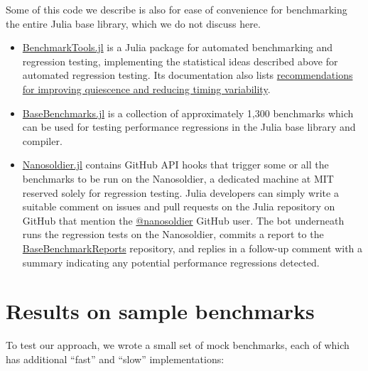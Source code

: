\documentclass[conference]{IEEEtran}
\begin{document}
Some of this code we describe is also for ease of convenience for benchmarking
the entire Julia base library, which we do not discuss here.

\begin{itemize}

\item
\href{https://github.com/JuliaCI/BenchmarkTools.jl}{BenchmarkTools.jl}
is a Julia package for automated benchmarking and regression testing, implementing the statistical ideas described above for automated regression testing. Its documentation also lists \href{https://github.com/JuliaCI/BenchmarkTools.jl/blob/60dfe83e5434c87b7311ca5d9f185f45752ed510/doc/linuxtips.md}{recommendations for improving quiescence and reducing timing variability}.

\item
\href{https://github.com/JuliaCI/BaseBenchmarks.jl}{BaseBenchmarks.jl}
is a collection of approximately 1,300 benchmarks which can be used for testing performance regressions in the Julia base library and compiler.

\item
\href{https://github.com/JuliaCI/Nanosoldier.jl}{Nanosoldier.jl}
contains GitHub API hooks that trigger some or all the benchmarks to be run on the Nanosoldier, a dedicated machine at MIT reserved solely for regression testing.
Julia developers can simply write a suitable comment on issues and pull requests on the Julia repository on GitHub that mention the \href{https://github.com/nanosoldier}{@nanosoldier} GitHub user. The bot underneath runs the regression tests on the Nanosoldier, commits a report to the \href{https://github.com/JuliaCI/BaseBenchmarkReports}{BaseBenchmarkReports} repository, and replies in a follow-up comment with a summary indicating any potential performance regressions detected.

\end{itemize}

\section{Results on sample benchmarks}

To test our approach, we wrote a small set of mock benchmarks, each of which has additional ``fast'' and ``slow'' implementations:
\end{document}
